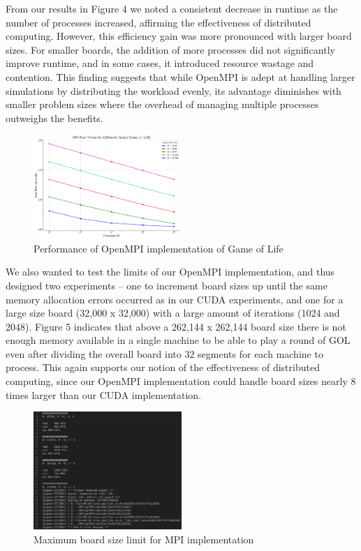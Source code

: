 \documentclass[11pt,twocolumn]{article}
\begin{document}
From our results in Figure 4 we noted a consistent decrease in runtime as the number of processes increased, affirming the effectiveness of distributed computing. However, this efficiency gain was more pronounced with larger board sizes. For smaller boards, the addition of more processes did not significantly improve runtime, and in some cases, it introduced resource wastage and contention. This finding suggests that while OpenMPI is adept at handling larger simulations by distributing the workload evenly, its advantage diminishes with smaller problem sizes where the overhead of managing multiple processes outweighs the benefits.

\begin{figure}[!htbp]
    \centering
    \includegraphics[width=0.5\textwidth]{newMPI.png}
    \caption{Performance of OpenMPI implementation of Game of Life}
    \label{fig:mpi}
\end{figure}

We also wanted to test the limits of our OpenMPI implementation, and thus designed two experiments -- one to increment board sizes up until the same memory allocation errors occurred as in our CUDA experiments, and one for a large size board (32,000 x 32,000) with a large amount of iterations (1024 and 2048). Figure 5 indicates that above a 262,144 x 262,144 board size there is not enough memory available in a single machine to be able to play a round of GOL even after dividing the overall board into 32 segments for each machine to process. This again supports our notion of the effectiveness of distributed computing, since our OpenMPI implementation could handle board sizes nearly 8 times larger than our CUDA implementation.

\begin{figure}[!htbp]
    \centering
    \includegraphics[width=0.5\textwidth]{MPIExp2.png}
    \caption{Maximum board size limit for MPI implementation}
    \label{fig:MPIExp2}
\end{figure}
\end{document}

